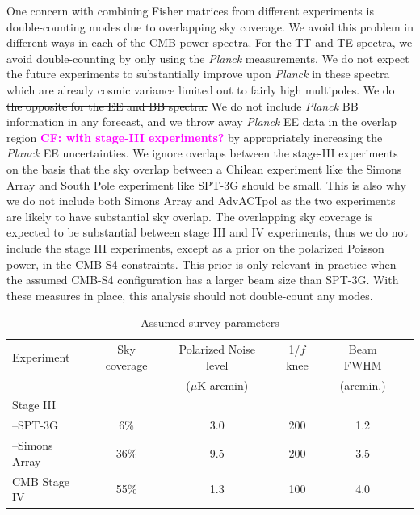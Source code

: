 \documentclass[apj]{emulateapj}
\newcommand{\planck}{{\sl Planck}}
\begin{document}
One concern with combining Fisher matrices from different experiments is double-counting modes due to overlapping sky coverage. 
We avoid this problem in different ways in each of the CMB power spectra. 
For the TT and TE spectra, we avoid double-counting by only using the \planck{} measurements. 
We do not expect the future experiments to substantially improve upon \planck{} in these spectra which are already cosmic variance limited out to fairly high multipoles. 
\st{We do the opposite for the EE and BB spectra. }
We do not include \planck{} BB information in any forecast, and we throw away \planck{} EE data in the overlap region \textbf{\textcolor{magenta}{CF: with stage-III experiments?}} by appropriately increasing the \planck{} EE uncertainties. 
We ignore overlaps between the stage-III experiments  on the basis that the sky overlap between a Chilean experiment like the Simons Array and South Pole experiment like SPT-3G should be small. 
This is also why we do not include both Simons Array and AdvACTpol as the two experiments are likely to have substantial sky overlap. 
The overlapping sky coverage is expected to be substantial between stage III and IV experiments, thus we do not include the stage III experiments, except as a prior on the polarized Poisson power, in the CMB-S4 constraints. 
This prior is only relevant in practice when the assumed CMB-S4 configuration has a larger beam size than SPT-3G. 
With these measures in place, this analysis should not double-count any modes. 


\begin{table}[tbh]
\begin{center}
\caption{\label{tab:experiments} Assumed survey parameters}
\small
\begin{tabular}{l || c c c c c }
Experiment & Sky coverage & Polarized Noise level  & 1/$f$ knee & Beam FWHM \\
& &($\mu$K-arcmin)&&(arcmin.)\\
\hline
Stage III & & & & \\

\mbox{--}SPT-3G & 6\% & 3.0 & 200 & 1.2 \\
\mbox{--}Simons Array & 36\% & 9.5 & 200 & 3.5 \\ 

\hline
CMB Stage IV & 55\% & 1.3 & 100 & 4.0 \\
\end{tabular}
 \normalsize
\end{center}
\end{table}
\end{document}
